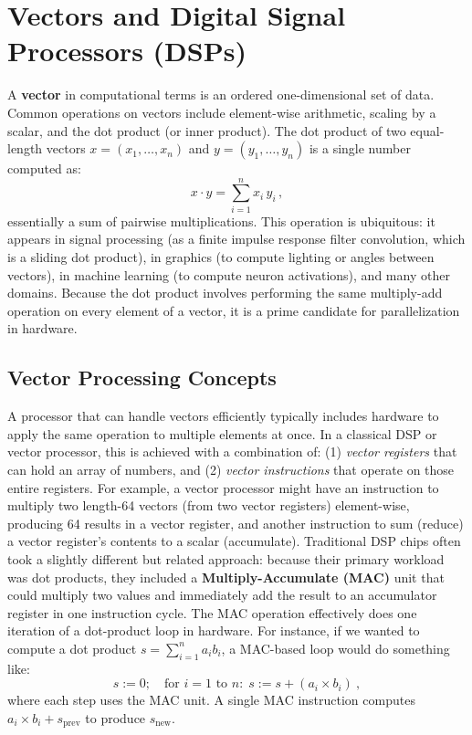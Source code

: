 \section{Vectors and Digital Signal Processors (DSPs)} 
A \textbf{vector} in computational terms is an ordered one-dimensional set of data. Common operations on vectors include element-wise arithmetic, scaling by a scalar, and the dot product (or inner product). The dot product of two equal-length vectors $x = (x_1,\dots,x_n)$ and $y = (y_1,\dots,y_n)$ is a single number computed as: 
\[ 
x \cdot y = \sum_{i=1}^{n} x_i \, y_i \,,
\] 
essentially a sum of pairwise multiplications. This operation is ubiquitous: it appears in signal processing (as a finite impulse response filter convolution, which is a sliding dot product), in graphics (to compute lighting or angles between vectors), in machine learning (to compute neuron activations), and many other domains. Because the dot product involves performing the same multiply-add operation on every element of a vector, it is a prime candidate for parallelization in hardware.

\subsection{Vector Processing Concepts} 
A processor that can handle vectors efficiently typically includes hardware to apply the same operation to multiple elements at once. In a classical DSP or vector processor, this is achieved with a combination of: (1) \emph{vector registers} that can hold an array of numbers, and (2) \emph{vector instructions} that operate on those entire registers. For example, a vector processor might have an instruction to multiply two length-64 vectors (from two vector registers) element-wise, producing 64 results in a vector register, and another instruction to sum (reduce) a vector register’s contents to a scalar (accumulate). Traditional DSP chips often took a slightly different but related approach: because their primary workload was dot products, they included a \textbf{Multiply-Accumulate (MAC)} unit that could multiply two values and immediately add the result to an accumulator register in one instruction cycle. The MAC operation effectively does one iteration of a dot-product loop in hardware. For instance, if we wanted to compute a dot product $s = \sum_{i=1}^{n} a_i b_i$, a MAC-based loop would do something like:
\[
s := 0; \quad \text{for } i=1 \text{ to } n: \; s := s + (a_i \times b_i)~,
\] 
where each step uses the MAC unit. A single MAC instruction computes $a_i\times b_i + s_{\text{prev}}$ to produce $s_{\text{new}}$. 

